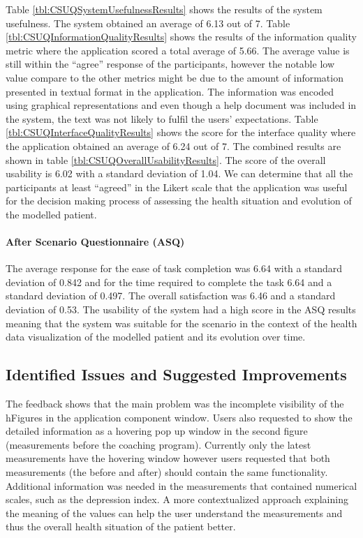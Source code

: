 \documentclass[twocolumn]{bmcart}%
\begin{document}
Table \ref{tbl:CSUQSystemUsefulnessResults} shows the results of the system usefulness. The system obtained an average of 6.13 out of 7. Table \ref{tbl:CSUQInformationQualityResults} shows the results of the information quality metric where the application scored a total average of 5.66. The average value is still within the ``agree'' response of the participants, however the notable low value compare to the other metrics might be due to the amount of information presented in textual format in the application. The information was encoded using graphical representations and even though a help document was included in the system, the text was not likely to fulfil the users' expectations. Table \ref{tbl:CSUQInterfaceQualityResults} shows the score for the interface quality where the application obtained an average of 6.24 out of 7. The combined results are shown in table \ref{tbl:CSUQOverallUsabilityResults}. The score of the overall usability is 6.02 with a standard deviation of 1.04. We can determine that all the participants at least ``agreed'' in the Likert scale that the application was useful for the decision making process of assessing the health situation and evolution of the modelled patient.

\paragraph*{After Scenario Questionnaire (ASQ)} The average response for the ease of task completion was 6.64 with a standard deviation of 0.842 and for the time required to complete the task 6.64 and a standard deviation of 0.497. The overall satisfaction was 6.46 and a standard deviation of 0.53. The usability of the system had a high score in the ASQ results meaning that the system was suitable for the scenario in the context of the health data visualization of the modelled patient and its evolution over time.

\subsection*{Identified Issues and Suggested Improvements}

The feedback shows that the main problem was the incomplete visibility of the hFigures in the application component window. Users also requested to show the detailed information as a hovering pop up window in the second figure (measurements before the coaching program). Currently only the latest measurements have the hovering window however users requested that both measurements (the before and after) should contain the same functionality. Additional information was needed in the measurements that contained numerical scales, such as the depression index. A more contextualized approach explaining the meaning of the values can help the user understand the measurements and thus the overall health situation of the patient better.
\end{document}
